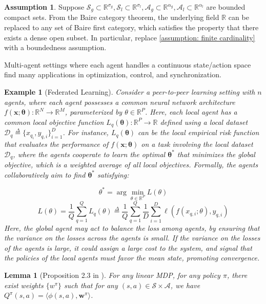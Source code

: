 \documentclass{article}
\newcommand\R{\mathbb{R}}
\theoremstyle{plain}
\newtheorem{example}[theorem]{Example}
\newtheorem{lemma}[theorem]{Lemma}
\theoremstyle{definition}
\newtheorem{assumption}[theorem]{Assumption}
\begin{document}
\begin{assumption}
Suppose $\mathcal{S}_g\subset \R^{\sigma_g}, \mathcal{S}_l\subset \R^{\sigma_l}, \mathcal{A}_g\subset \R^{\alpha_g},\mathcal{A}_l\subset \R^{\alpha_l}$ are bounded compact sets. From the Baire category theorem, the underlying field $\R$ can be replaced to any set of Baire first category, which satisfies the property that there exists a dense open subset. In particular, replace \cref{assumption: finite cardinality} with a boundedness assumption.
\end{assumption}

Multi-agent settings where each agent handles a continuous state/action space find many applications in optimization, control, and synchronization.

\begin{example}[Federated Learning] Consider a peer-to-peer learning setting \citep{chaudhari2024peertopeerlearningdynamicswide} with $n$ agents, where each agent possesses a common neural network architecture $f(\mathbf{x}; \mathbf{\theta}):\R^N\to\R^M$, parameterized by $\theta\in\R^P$. Here, each local agent has a common local objective function $L_q(\mathbf{\theta}):\R^P\to\R$ defined using a local dataset $\mathcal{D}_q\stackrel{\Delta}{=} \{x_{q_i},y_{q,i}\}_{i=1}^D$. For instance, $L_q(\mathbf{\theta})$ can be the local empirical risk function that evaluates the performance of $f(\mathbf{x};\mathbf{\theta})$ on a task involving the local dataset $\mathcal{D}_q$, where the agents cooperate to learn the optimal $\mathbf{\theta}^*$ that minimizes the global objective, which is a weighted average of all local objectives. Formally, the agents collaboratively aim to find $\mathbf{\theta}^*$ satisfying:

\[\theta^* =  \arg\min_{\theta\in\R^P} L(\theta)\]
\[L(\theta) = \frac{1}{Q}\sum_{q=1}^Q L_q(\theta)\stackrel{\Delta}{=}\frac{1}{Q}\sum_{q=1}^Q \frac{1}{D}\sum_{i=1}^D \ell(f(x_{q,i};\theta),y_{q,i})\]
Here, the global agent may act to balance the loss among agents, by ensuring that the variance on the losses across the agents is small. If the variance on the losses of the agents is large, it could assign a large cost to the system, and signal that the policies of the local agents must favor the mean state, promoting convergence. \\
\end{example}

\begin{lemma}[Proposition 2.3 in \cite{pmlr-v125-jin20a}] \emph{For any linear MDP, for any policy $\pi$, there exist weights $\{w^\pi\}$ such that for any $(s,a)\in\mathcal{S}\times\mathcal{A}$, we have $Q^{\pi}(s,a) = \langle \phi(s,a),\mathbf{w}^\pi\rangle$.}
\end{lemma}
\end{document}
